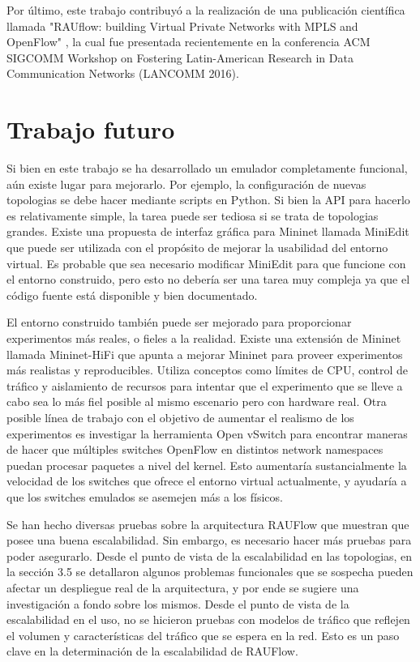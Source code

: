 Por último, este trabajo contribuyó a la realización de una publicación científica llamada "RAUflow: building Virtual Private Networks with MPLS and OpenFlow" \cite{rauflow}, la cual fue presentada recientemente en la conferencia ACM SIGCOMM Workshop on Fostering Latin-American Research in Data Communication Networks (LANCOMM 2016).


\section{Trabajo futuro}

Si bien en este trabajo se ha desarrollado un emulador completamente funcional, aún existe lugar para mejorarlo. Por ejemplo, la configuración de nuevas topologias se debe hacer mediante scripts en Python. Si bien la API para hacerlo es relativamente simple, la tarea puede ser tediosa si se trata de topologias grandes. Existe una propuesta de interfaz gráfica para Mininet llamada MiniEdit \cite{miniedit} que puede ser utilizada con el propósito de mejorar la usabilidad del entorno virtual. Es probable que sea necesario modificar MiniEdit para que funcione con el entorno construido, pero esto no debería ser una tarea muy compleja ya que el código fuente está disponible y bien documentado.

El entorno construido también puede ser mejorado para proporcionar experimentos más reales, o fieles a la realidad. Existe una extensión de Mininet llamada Mininet-HiFi \cite{mininet-hifi} que apunta a mejorar Mininet para proveer experimentos más realistas y reproducibles. Utiliza conceptos como límites de CPU, control de tráfico y aislamiento de recursos para intentar que el experimento que se lleve a cabo sea lo más fiel posible al mismo escenario pero con hardware real.
Otra posible línea de trabajo con el objetivo de aumentar el realismo de los experimentos es investigar la herramienta Open vSwitch para encontrar maneras de hacer que múltiples switches OpenFlow en distintos network namespaces puedan procesar paquetes a nivel del kernel. Esto aumentaría sustancialmente la velocidad de los switches que ofrece el entorno virtual actualmente, y ayudaría a que los switches emulados se asemejen más a los físicos.

Se han hecho diversas pruebas sobre la arquitectura RAUFlow que muestran que posee una buena escalabilidad. Sin embargo, es necesario hacer más pruebas para poder asegurarlo. Desde el punto de vista de la escalabilidad en las topologias, en la sección 3.5 se detallaron algunos problemas funcionales que se sospecha pueden afectar un despliegue real de la arquitectura, y por ende se sugiere una investigación a fondo sobre los mismos. Desde el punto de vista de la escalabilidad en el uso, no se hicieron pruebas con modelos de tráfico que reflejen el volumen y características del tráfico que se espera en la red. Esto es un paso clave en la determinación de la escalabilidad de RAUFlow.


